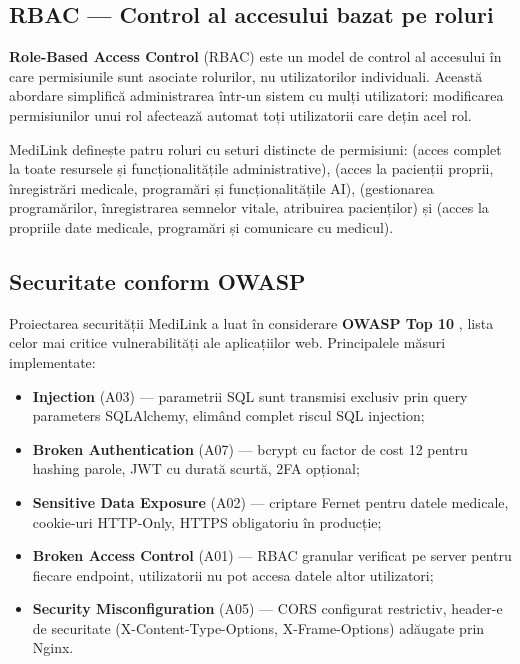 \subsection{RBAC --- Control al accesului bazat pe roluri}

\textbf{Role-Based Access Control} (RBAC) \cite{sandhu1996rbac} este un model de control al accesului în care permisiunile sunt asociate rolurilor, nu utilizatorilor individuali. Această abordare simplifică administrarea într-un sistem cu mulți utilizatori: modificarea permisiunilor unui rol afectează automat toți utilizatorii care dețin acel rol.

MediLink definește patru roluri cu seturi distincte de permisiuni:  (acces complet la toate resursele și funcționalitățile administrative),  (acces la pacienții proprii, înregistrări medicale, programări și funcționalitățile AI),  (gestionarea programărilor, înregistrarea semnelor vitale, atribuirea pacienților) și  (acces la propriile date medicale, programări și comunicare cu medicul).

\subsection{Securitate conform OWASP}

Proiectarea securității MediLink a luat în considerare \textbf{OWASP Top 10} \cite{owasp2021}, lista celor mai critice vulnerabilități ale aplicațiilor web. Principalele măsuri implementate:

\begin{itemize}
  \item \textbf{Injection} (A03) --- parametrii SQL sunt transmisi exclusiv prin query parameters SQLAlchemy, elimând complet riscul SQL injection;
  \item \textbf{Broken Authentication} (A07) --- bcrypt cu factor de cost 12 pentru hashing parole, JWT cu durată scurtă, 2FA opțional;
  \item \textbf{Sensitive Data Exposure} (A02) --- criptare Fernet pentru datele medicale, cookie-uri HTTP-Only, HTTPS obligatoriu în producție;
  \item \textbf{Broken Access Control} (A01) --- RBAC granular verificat pe server pentru fiecare endpoint, utilizatorii nu pot accesa datele altor utilizatori;
  \item \textbf{Security Misconfiguration} (A05) --- CORS configurat restrictiv, header-e de securitate (X-Content-Type-Options, X-Frame-Options) adăugate prin Nginx.
\end{itemize}

